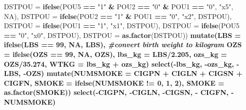 \documentclass[
  12pt,
]{article}
\newenvironment{Shaded}{\begin{snugshade}}{\end{snugshade}}
\newcommand{\CommentTok}[1]{\textcolor[rgb]{0.56,0.35,0.01}{\textit{#1}}}
\newcommand{\DataTypeTok}[1]{\textcolor[rgb]{0.13,0.29,0.53}{#1}}
\newcommand{\DecValTok}[1]{\textcolor[rgb]{0.00,0.00,0.81}{#1}}
\newcommand{\FloatTok}[1]{\textcolor[rgb]{0.00,0.00,0.81}{#1}}
\newcommand{\KeywordTok}[1]{\textcolor[rgb]{0.13,0.29,0.53}{\textbf{#1}}}
\newcommand{\NormalTok}[1]{#1}
\newcommand{\OperatorTok}[1]{\textcolor[rgb]{0.81,0.36,0.00}{\textbf{#1}}}
\newcommand{\OtherTok}[1]{\textcolor[rgb]{0.56,0.35,0.01}{#1}}
\newcommand{\StringTok}[1]{\textcolor[rgb]{0.31,0.60,0.02}{#1}}
\begin{document}
\begin{Shaded}
\begin{Highlighting}[]
{{{{{{{{         \DataTypeTok{DSTPOU =} \KeywordTok{ifelse}\NormalTok{(POU5 }\OperatorTok{==}\StringTok{ "1"} \OperatorTok{&}\StringTok{ }\NormalTok{POU2 }\OperatorTok{==}\StringTok{ "0"} \OperatorTok{&}\StringTok{ }\NormalTok{POU1 }\OperatorTok{==}\StringTok{ "0"}\NormalTok{, }\StringTok{"x5"}\NormalTok{, }\OtherTok{NA}\NormalTok{),}
         \DataTypeTok{DSTPOU =} \KeywordTok{ifelse}\NormalTok{(POU2 }\OperatorTok{==}\StringTok{ "1"} \OperatorTok{&}\StringTok{ }\NormalTok{POU1 }\OperatorTok{==}\StringTok{ "0"}\NormalTok{, }\StringTok{"x2"}\NormalTok{, DSTPOU),}
         \DataTypeTok{DSTPOU =} \KeywordTok{ifelse}\NormalTok{(POU1 }\OperatorTok{==}\StringTok{ "1"}\NormalTok{, }\StringTok{"x1"}\NormalTok{, DSTPOU),}
         \DataTypeTok{DSTPOU =} \KeywordTok{ifelse}\NormalTok{(POU5 }\OperatorTok{==}\StringTok{ "0"}\NormalTok{, }\StringTok{"x0"}\NormalTok{, DSTPOU),}
         \DataTypeTok{DSTPOU =} \KeywordTok{as.factor}\NormalTok{(DSTPOU)) }\OperatorTok{%
\StringTok{  }\KeywordTok{mutate}\NormalTok{(}\DataTypeTok{LBS =} \KeywordTok{ifelse}\NormalTok{(LBS }\OperatorTok{==}\StringTok{ }\DecValTok{99}\NormalTok{, }\OtherTok{NA}\NormalTok{, LBS), }\CommentTok{#convert birth weight to kilogram}
         \DataTypeTok{OZS =} \KeywordTok{ifelse}\NormalTok{(OZS }\OperatorTok{==}\StringTok{ }\DecValTok{99}\NormalTok{, }\OtherTok{NA}\NormalTok{, OZS),}
         \DataTypeTok{lbs_kg =}\NormalTok{ LBS}\OperatorTok{/}\FloatTok{2.205}\NormalTok{,}
         \DataTypeTok{ozs_kg =}\NormalTok{ OZS}\OperatorTok{/}\FloatTok{35.274}\NormalTok{,}
         \DataTypeTok{WTKG =}\NormalTok{ lbs_kg }\OperatorTok{+}\StringTok{ }\NormalTok{ozs_kg) }\OperatorTok{%
\StringTok{  }\KeywordTok{select}\NormalTok{(}\OperatorTok{-}\NormalTok{lbs_kg, }\OperatorTok{-}\NormalTok{ozs_kg, }\OperatorTok{-}\NormalTok{LBS, }\OperatorTok{-}\NormalTok{OZS) }\OperatorTok{%
\StringTok{  }\KeywordTok{mutate}\NormalTok{(}\DataTypeTok{NUMSMOKE =}\NormalTok{ CIGPN }\OperatorTok{+}\StringTok{ }\NormalTok{CIGLN }\OperatorTok{+}\StringTok{ }\NormalTok{CIGSN }\OperatorTok{+}\StringTok{ }\NormalTok{CIGFN,}
         \DataTypeTok{SMOKE =} \KeywordTok{ifelse}\NormalTok{(NUMSMOKE }\OperatorTok{!=}\StringTok{ }\DecValTok{0}\NormalTok{, }\DecValTok{1}\NormalTok{, }\DecValTok{2}\NormalTok{),}
         \DataTypeTok{SMOKE =} \KeywordTok{as.factor}\NormalTok{(SMOKE)) }\OperatorTok{%
\StringTok{  }\KeywordTok{select}\NormalTok{(}\OperatorTok{-}\NormalTok{CIGPN, }\OperatorTok{-}\NormalTok{CIGLN, }\OperatorTok{-}\NormalTok{CIGSN, }\OperatorTok{-}\StringTok{ }\NormalTok{CIGFN, }\OperatorTok{-}\NormalTok{NUMSMOKE) }\OperatorTok{%
}}}}}}}}}}}}}
\end{Highlighting}
\end{Shaded}
\end{document}

